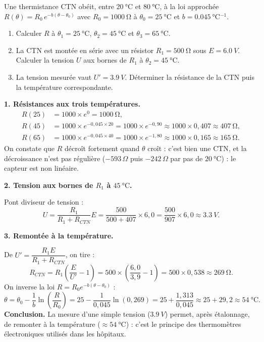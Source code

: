 \documentclass[11pt]{article}
\newcommand{\cle}[1]{{\popxbold\color{popdark}#1}}
\begin{document}
\begin{exoresolu}
Une thermistance CTN obéit, entre $\SI{20}{\celsius}$ et $\SI{80}{\celsius}$, à la loi approchée $R(\theta) = R_0\, e^{-b(\theta - \theta_0)}$ avec $R_0 = \SI{1000}{\ohm}$ à $\theta_0 = \SI{25}{\celsius}$ et $b = \SI{0,045}{\celsius^{-1}}$.
\begin{enumerate}
\item Calculer $R$ à $\theta_1 = \SI{25}{\celsius}$, $\theta_2 = \SI{45}{\celsius}$ et $\theta_3 = \SI{65}{\celsius}$.
\item La CTN est montée en série avec un résistor $R_1 = \SI{500}{\ohm}$ sous $E = \SI{6,0}{V}$. Calculer la tension $U$ aux bornes de $R_1$ à $\theta_2 = \SI{45}{\celsius}$.
\item La tension mesurée vaut $U' = \SI{3,9}{V}$. Déterminer la résistance de la CTN puis la température correspondante.
\end{enumerate}
\tcblower
\textbf{1. Résistances aux trois températures.}
\begin{align*}
R(25) &= 1000 \times e^{0} = \SI{1000}{\ohm},\\
R(45) &= 1000 \times e^{-0{,}045 \times 20} = 1000 \times e^{-0{,}90} \approx 1000 \times 0{,}407 \approx \SI{407}{\ohm},\\
R(65) &= 1000 \times e^{-0{,}045 \times 40} = 1000 \times e^{-1{,}80} \approx 1000 \times 0{,}165 \approx \SI{165}{\ohm}.
\end{align*}
On constate que $R$ décroît fortement quand $\theta$ croît : c'est bien une \cle{CTN}, et la décroissance n'est pas régulière ($-593\,\Omega$ puis $-242\,\Omega$ par pas de $\SI{20}{\celsius}$) : le capteur est \cle{non linéaire}.

\textbf{2. Tension aux bornes de $R_1$ à $\SI{45}{\celsius}$.}

Pont diviseur de tension :
\[
U = \frac{R_1}{R_1 + R_{CTN}} E = \frac{500}{500 + 407} \times 6{,}0 = \frac{500}{907} \times 6{,}0 \approx \SI{3,3}{V}.
\]

\textbf{3. Remontée à la température.}

De $U' = \dfrac{R_1 E}{R_1 + R_{CTN}}$, on tire :
\[
R_{CTN} = R_1\left(\frac{E}{U'} - 1\right) = 500 \times \left(\frac{6{,}0}{3{,}9} - 1\right) = 500 \times 0{,}538 \approx \SI{269}{\ohm}.
\]
On inverse la loi $R = R_0 e^{-b(\theta - \theta_0)}$ :
\[
\theta = \theta_0 - \frac{1}{b}\ln\!\left(\frac{R}{R_0}\right) = 25 - \frac{1}{0{,}045}\ln(0{,}269) = 25 + \frac{1{,}313}{0{,}045} \approx 25 + 29{,}2 \approx \SI{54}{\celsius}.
\]
\textbf{Conclusion.} La mesure d'une simple tension ($\SI{3,9}{V}$) permet, après étalonnage, de remonter à la température ($\approx \SI{54}{\celsius}$) : c'est le principe des thermomètres électroniques utilisés dans les hôpitaux.
\end{exoresolu}
\end{document}

